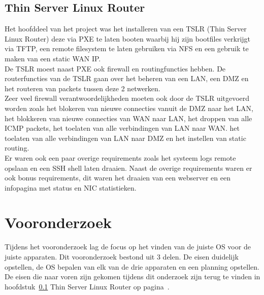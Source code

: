 \documentclass[12pt]{article}
\begin{document}
\subsection{Thin Server Linux Router} %
\label{sub:thin_server_linux_router}
Het hoofddeel van het project was het installeren van een TSLR (Thin Server Linux Router) deze via PXE te laten booten waarbij hij zijn bootfiles verkrijgt via TFTP, een remote filesystem te laten gebruiken via NFS en een gebruik te maken van een static WAN IP.
\\De TSLR moest naast PXE ook firewall en routingfuncties hebben. De routerfuncties van de TSLR gaan over het beheren van een LAN, een DMZ en het routeren van packets tussen deze 2 netwerken.
\\Zeer veel firewall verantwoordelijkheden moeten ook door de TSLR uitgevoerd worden zoals het blokeren van nieuwe connecties vanuit de DMZ naar het LAN, het blokkeren van nieuwe connecties van WAN naar LAN, het droppen van alle ICMP packets, het toelaten van alle verbindingen van LAN naar WAN. het toelaten van alle verbindingen van LAN naar DMZ en het instellen van static routing.
\\Er waren ook een paar overige requirements zoals het systeem logs remote opslaan en een SSH shell laten draaien. Naast de overige requirements waren er ook bonus requirements, dit waren het draaien van een webserver en een infopagina met status en NIC statistieken.
\section{Vooronderzoek}
Tijdens het vooronderzoek lag de focus op het vinden van de juiste OS voor de juiste apparaten. Dit vooronderzoek bestond uit 3 delen. De eisen duidelijk opstellen, de OS bepalen van elk van de drie apparaten en een planning opstellen.\\

De eisen die naar voren zijn gekomen tijdens dit onderzoek zijn terug te vinden in hoofdstuk~\ref{sub:thin_server_linux_router} Thin Server Linux Router op pagina~\pageref{sub:thin_server_linux_router}.\\
\end{document}
